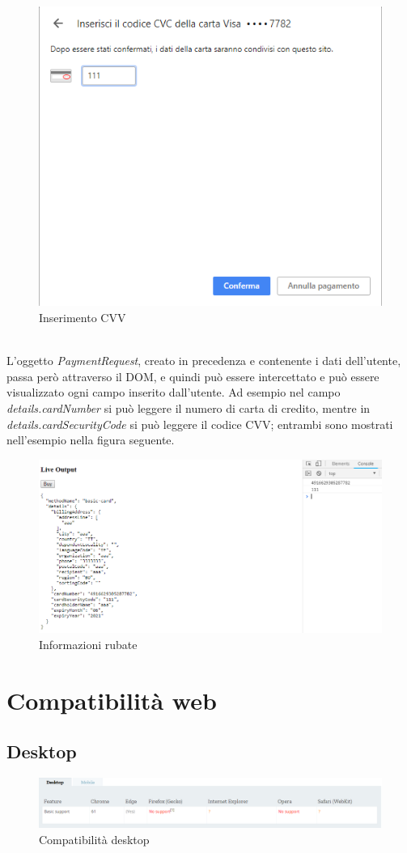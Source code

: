 \documentclass[11pt ,a4paper , twoside , openright ]{book}
\begin{document}
	\begin{figure}[h]
		\centering
		\includegraphics[width=0.5\linewidth]{Chrome2}
		\caption{Inserimento CVV}
		\label{fig: Inserimento CVV}
	\end{figure}
	\\
	\pagebreak
	L'oggetto \textit{PaymentRequest}, creato in precedenza e contenente i dati dell'utente, passa però attraverso il DOM, e quindi può essere intercettato e può essere visualizzato ogni campo inserito dall'utente. Ad esempio nel campo \textit{details.cardNumber} si può leggere il numero di carta di credito, mentre in \textit{details.cardSecurityCode} si può leggere il codice CVV; entrambi sono mostrati nell'esempio nella figura seguente.
	\begin{figure}[h]
		\centering
		\includegraphics[width=1\linewidth]{Informazioni}
		\caption{Informazioni rubate}
		\label{fig: Informazioni rubate}
	\end{figure}
	\section{Compatibilità web}
	\subsection{Desktop}
	\begin{figure}[h]
		\centering
		\includegraphics[width=1\linewidth]{Compatibilita1}
		\caption{Compatibilità desktop}
		\label{fig: Compatibilità desktop}
	\end{figure}
\end{document}
